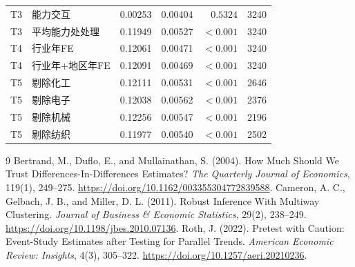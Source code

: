 \documentclass[UTF8,11pt,fontset=none]{ctexart}
\begin{document}
\begin{longtable}{llrrrr}
T3 & 能力交互 & 0.00253 & 0.00404 & $0.5324$ & 3240\\
T3 & 平均能力处处理 & 0.11949 & 0.00527 & $<0.001$ & 3240\\
T4 & 行业年FE & 0.12061 & 0.00471 & $<0.001$ & 3240\\
T4 & 行业年+地区年FE & 0.12091 & 0.00469 & $<0.001$ & 3240\\
T5 & 剔除化工 & 0.12111 & 0.00531 & $<0.001$ & 2646\\
T5 & 剔除电子 & 0.12038 & 0.00562 & $<0.001$ & 2376\\
T5 & 剔除机械 & 0.12256 & 0.00547 & $<0.001$ & 2196\\
T5 & 剔除纺织 & 0.11977 & 0.00540 & $<0.001$ & 2502\\
\bottomrule\end{longtable}\normalsize
\begin{thebibliography}{9}
 Bertrand, M., Duflo, E., and Mullainathan, S. (2004). How Much Should We Trust Differences-In-Differences Estimates? \emph{The Quarterly Journal of Economics}, 119(1), 249--275. \url{https://doi.org/10.1162/003355304772839588}.
 Cameron, A. C., Gelbach, J. B., and Miller, D. L. (2011). Robust Inference With Multiway Clustering. \emph{Journal of Business \& Economic Statistics}, 29(2), 238--249. \url{https://doi.org/10.1198/jbes.2010.07136}.
 Roth, J. (2022). Pretest with Caution: Event-Study Estimates after Testing for Parallel Trends. \emph{American Economic Review: Insights}, 4(3), 305--322. \url{https://doi.org/10.1257/aeri.20210236}.
\end{thebibliography}
\end{document}
